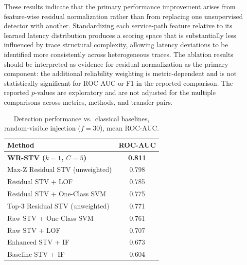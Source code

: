 \documentclass[informatics,article,submit,moreauthors]{Definitions/mdpi}
\begin{document}
These results indicate that the primary performance improvement arises
from feature-wise residual normalization rather than from replacing one
unsupervised detector with another. Standardizing each service-path
feature relative to its learned latency distribution produces a scoring
space that is substantially less influenced by trace structural
complexity, allowing latency deviations to be identified more
consistently across heterogeneous traces. The ablation results should
be interpreted as evidence for residual normalization as the primary
component: the additional reliability weighting is metric-dependent
and is not statistically significant for ROC-AUC or F1 in the reported
comparison. The reported \(p\)-values are exploratory and are not
adjusted for the multiple comparisons across metrics, methods, and
transfer pairs.

\begin{table}[t]
    \centering
    \caption{Detection performance vs.\ classical baselines,
        random-visible injection (\(f=30\)), mean ROC-AUC.}
    \label{tab:extra-baselines}
    \begin{tabular}{lc}
        \toprule
        \textbf{Method} & \textbf{ROC-AUC} \\
        \midrule
        \textbf{WR-STV (\(k=1\), \(C=5\))} & \textbf{0.811} \\
        Max-Z Residual STV (unweighted)      & 0.798 \\
        Residual STV + LOF                   & 0.785 \\
        Residual STV + One-Class SVM         & 0.775 \\
        Top-3 Residual STV (unweighted)      & 0.771 \\
        Raw STV + One-Class SVM              & 0.761 \\
        Raw STV + LOF                        & 0.707 \\
        Enhanced STV + IF                    & 0.673 \\
        Baseline STV + IF                    & 0.604 \\
        \bottomrule
    \end{tabular}
\end{table}
\end{document}
